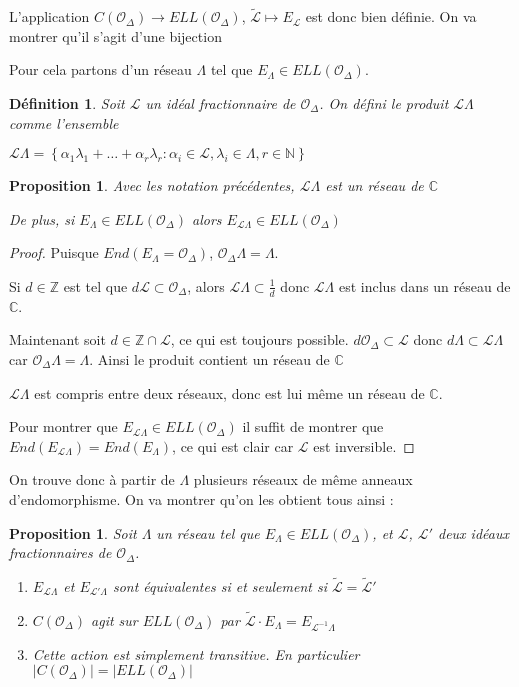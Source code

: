 \documentclass{article}
\newcommand{\N}[0]{\mathbb{N}}
\newcommand{\Z}[0]{\mathbb{Z}}
\newcommand{\C}[0]{\mathbb{C}}
\newcommand{\OR}[0]{\mathcal{O}}
\newcommand{\LR}[0]{\mathcal{L}}
\newcommand{\CL}[0]{\tilde{\LR}}
\newtheorem{Prop}[The]{Proposition}
\newtheorem{Def}[The]{Définition}
\begin{document}
L'application $C(\OR_{\Delta})\rightarrow ELL(\OR_{\Delta})$, $\CL\mapsto E_{\LR}$ est donc bien définie. On va montrer qu'il s'agit d'une bijection

Pour cela partons d'un réseau $\Lambda$ tel que $E_{\Lambda}\in ELL(\OR_{\Delta})$. 

\begin{Def}
	Soit $\LR$ un idéal fractionnaire de $\OR_{\Delta}$. On défini le produit $\LR\Lambda$ comme l'ensemble 
	
	$\LR\Lambda = \left\lbrace \alpha_1\lambda_1 + \ldots + \alpha_r\lambda_r : \alpha_i\in\LR , \lambda_i\in\Lambda , r\in\N\right\rbrace$ 
\end{Def}
	
\begin{Prop}
	Avec les notation précédentes, $\LR\Lambda$ est un réseau de $\C$ 
	
	De plus, si $E_{\Lambda}\in ELL(\OR_{\Delta})$ alors $E_{\LR\Lambda}\in ELL(\OR_{\Delta})$
\end{Prop}

\begin{proof}
	Puisque $End(E_{\Lambda} = \OR_{\Delta})$, $\OR_{\Delta}\Lambda = \Lambda$. 
	
	Si $d\in\Z$ est tel que $d\LR\subset\OR_{\Delta}$, alors $\LR\Lambda\subset\frac{1}{d}$ donc $\LR\Lambda$ est inclus dans un réseau de $\C$. 
	
	Maintenant soit $d\in\Z\cap\LR$, ce qui est toujours possible. $d\OR_{\Delta}\subset\LR$ donc $d\Lambda\subset\LR\Lambda$ car $\OR_{\Delta}\Lambda = \Lambda$. Ainsi le produit contient un réseau de $\C$
	
	$\LR\Lambda$ est compris entre deux réseaux, donc est lui même un réseau de $\C$.
	
	Pour montrer que $E_{\LR\Lambda}\in ELL(\OR_{\Delta})$ il suffit de montrer que $End(E_{\LR\Lambda}) = End(E_{\Lambda})$, ce qui est clair car $\LR$ est inversible. 
\end{proof}

On trouve donc à partir de $\Lambda$ plusieurs réseaux de même anneaux d'endomorphisme. On va montrer qu'on les obtient tous ainsi :

\begin{Prop}
	Soit $\Lambda$ un réseau tel que $E_{\Lambda}\in ELL(\OR_{\Delta})$, et $\LR$, $\LR'$ deux idéaux fractionnaires de $\OR_{\Delta}$. 
	
	\begin{enumerate}
		\item $E_{\LR\Lambda}$ et $E_{\LR'\Lambda}$ sont équivalentes si et seulement si $\CL = \CL'$
		\item $C(\OR_{\Delta})$ agit sur $ELL(\OR_{\Delta})$ par $\CL\cdot E_{\Lambda} = E_{\LR^{-1}\Lambda}$
		\item Cette action est simplement transitive. En particulier $\left| C(\OR_{\Delta})\right| = \left| ELL(\OR_{\Delta})\right| $
	\end{enumerate}
\end{Prop}
\end{document}
